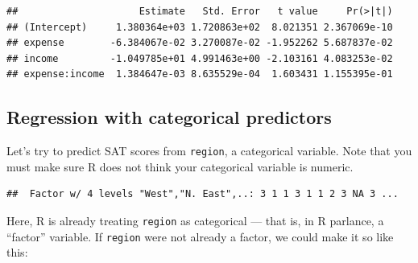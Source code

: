 \documentclass[
]{book}
\newenvironment{Shaded}{\begin{snugshade}}{\end{snugshade}}
\newcommand{\CommentTok}[1]{\textcolor[rgb]{0.56,0.35,0.01}{\textit{#1}}}
\newcommand{\DataTypeTok}[1]{\textcolor[rgb]{0.13,0.29,0.53}{#1}}
\newcommand{\KeywordTok}[1]{\textcolor[rgb]{0.13,0.29,0.53}{\textbf{#1}}}
\newcommand{\NormalTok}[1]{#1}
\newcommand{\OperatorTok}[1]{\textcolor[rgb]{0.81,0.36,0.00}{\textbf{#1}}}
\newcommand{\StringTok}[1]{\textcolor[rgb]{0.31,0.60,0.02}{#1}}
\begin{document}
\begin{verbatim}
##                     Estimate   Std. Error   t value     Pr(>|t|)
## (Intercept)     1.380364e+03 1.720863e+02  8.021351 2.367069e-10
## expense        -6.384067e-02 3.270087e-02 -1.952262 5.687837e-02
## income         -1.049785e+01 4.991463e+00 -2.103161 4.083253e-02
## expense:income  1.384647e-03 8.635529e-04  1.603431 1.155395e-01
\end{verbatim}

\hypertarget{regression-with-categorical-predictors}{%
\subsection{Regression with categorical predictors}\label{regression-with-categorical-predictors}}

Let's try to predict SAT scores from \texttt{region}, a categorical variable.
Note that you must make sure R does not think your categorical variable is numeric.

\begin{Shaded}
\end{Shaded}

\begin{verbatim}
##  Factor w/ 4 levels "West","N. East",..: 3 1 1 3 1 1 2 3 NA 3 ...
\end{verbatim}

Here, R is already treating \texttt{region} as categorical --- that is, in R parlance, a ``factor'' variable. If \texttt{region} were not already a factor, we could make it so like this:

\begin{Shaded}
\end{Shaded}
\end{document}
